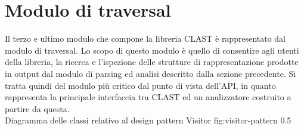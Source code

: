 \section{Modulo di traversal}

Il terzo e ultimo modulo che compone la libreria CLAST è rappresentato dal
modulo di traversal. Lo scopo di questo modulo è quello di consentire agli
utenti della libreria, la ricerca e l'ispezione delle strutture di
rappresentazione prodotte in output dal modulo di parsing ed analisi descritto
dalla sezione precedente. Si tratta quindi del modulo più critico dal punto di
vista dell'API, in quanto rappresenta la principale interfaccia tra CLAST ed
un analizzatore costruito a partire da questa.\\

      {Diagramma delle classi relativo al design pattern Visitor}
      {fig:visitor-pattern}
      {0.5}






